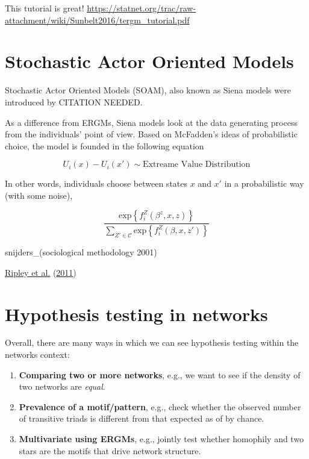\documentclass[
]{book}
\begin{document}
This tutorial is great! \url{https://statnet.org/trac/raw-attachment/wiki/Sunbelt2016/tergm_tutorial.pdf}

\hypertarget{stochastic-actor-oriented-models}{%
\chapter{Stochastic Actor Oriented Models}\label{stochastic-actor-oriented-models}}

Stochastic Actor Oriented Models (SOAM), also known as Siena models were introduced by CITATION NEEDED.

As a difference from ERGMs, Siena models look at the data generating process from the individuals' point of view. Based on McFadden's ideas of probabilistic choice, the model is founded in the following equation

\[
U_i(x) - U_i(x') \sim \mbox{Extreame Value Distribution}
\]

In other words, individuals choose between states \(x\) and \(x'\) in a probabilistic way (with some noise),

\[
\frac{\mbox{exp}\left\{f_i^Z(\beta^z,x, z)\right\}}{\sum_{Z'\in\mathcal{C}}\mbox{exp}\left\{f_i^{Z}(\beta, x, z')\right\}}
\]

snijders\_(sociological methodology 2001)

\protect\hyperlink{ref-Ripley2011}{Ripley et al.} (\protect\hyperlink{ref-Ripley2011}{2011})

\hypertarget{hypothesis-testing-in-networks}{%
\chapter{Hypothesis testing in networks}\label{hypothesis-testing-in-networks}}

Overall, there are many ways in which we can see hypothesis testing within
the networks context:

\begin{enumerate}
\def\labelenumi{\arabic{enumi}.}
\item
  \textbf{Comparing two or more networks}, e.g., we want to see if the density of
  two networks are \emph{equal}.
\item
  \textbf{Prevalence of a motif/pattern}, e.g., check whether the observed number
  of transitive triads is different from that expected as of by chance.
\item
  \textbf{Multivariate using ERGMs}, e.g., jointly test whether homophily and
  two stars are the motifs that drive network structure.
\end{enumerate}
\end{document}
